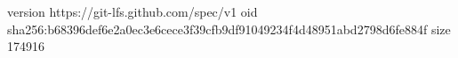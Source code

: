 version https://git-lfs.github.com/spec/v1
oid sha256:b68396def6e2a0ec3e6cece3f39cfb9df91049234f4d48951abd2798d6fe884f
size 174916
